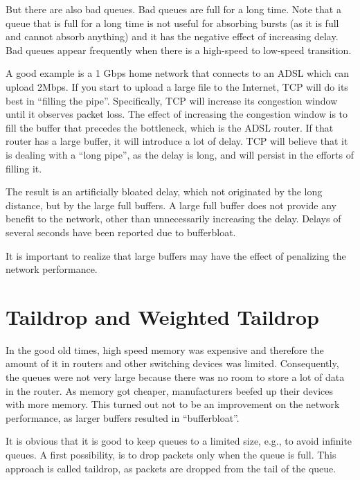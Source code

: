 But there are also bad queues.
Bad queues are full for a long time.
Note that a queue that is full for a long time is not useful for absorbing bursts (as it is full and cannot absorb anything) and it has the negative effect of increasing delay.
Bad queues appear frequently when there is a high-speed to low-speed transition.

A good example is a 1 Gbps home network that connects to an ADSL which can upload 2Mbps.
If you start to upload a large file to the Internet, TCP will do its best in ``filling the pipe''.
Specifically, TCP will increase its congestion window until it observes packet loss.
The effect of increasing the congestion window is to fill the buffer that precedes the bottleneck, which is the ADSL router.
If that router has a large buffer, it will introduce a lot of delay.
TCP will believe that it is dealing with a ``long pipe'', as the delay is long, and will persist in the efforts of filling it.

The result is an artificially bloated delay, which not originated by the long distance, but by the large full buffers.
A large full buffer does not provide any benefit to the network, other than unnecessarily increasing the delay.
Delays of several seconds have been reported due to bufferbloat.

It is important to realize that large buffers may have the effect of penalizing the network performance.

\section{Taildrop and Weighted Taildrop}

In the good old times, high speed memory was expensive and therefore the amount of it in routers and other switching devices was limited.
Consequently, the queues were not very large because there was no room to store a lot of data in the router.
As memory got cheaper, manufacturers beefed up their devices with more memory.
This turned out not to be an improvement on the network performance, as larger buffers resulted in ``bufferbloat''.

It is obvious that it is good to keep queues to a limited size, e.g., to avoid infinite queues.
A first possibility, is to drop packets only when the  queue is full.
This approach is called taildrop, as packets are dropped from the tail of the queue.


